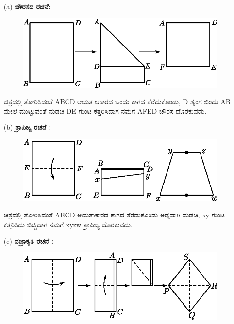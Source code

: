 \begin{itemize}
\item[(a)] \textbf{ಚೌರಸದ ರಚನೆ:}
\begin{figure}[H]
\centering
\includegraphics[scale=.98]{src/figure/chap1/fig1-15a.eps}
\end{figure}

ಚಿತ್ರದಲ್ಲಿ ತೋರಿಸಿದಂತೆ ABCD ಆಯತ ಆಕಾರದ ಒಂದು ಕಾಗದ ತೆರೆದುಕೊಂಡು, D ಶೃಂಗ ಬಿಂದು AB ಮೇಲೆ ಮುಟ್ಟುವಂತೆ ಮಡಚಿ DE ಗುಂಟ ಕತ್ತರಿಸಿದಾಗ ನಮಗೆ  AFED ಚೌರಸ ದೊರಕುವದು. 

\item[(b)] \textbf{ತ್ರಾಪಿಜ್ಯ ರಚನೆ :}
\begin{figure}[H]
\centering
\includegraphics[scale=.98]{src/figure/chap1/fig1-15b.eps}
\end{figure}

ಚಿತ್ರದಲ್ಲಿ ತೋರಿಸಿದಂತೆ ABCD ಆಯತಾಕಾರದ ಕಾಗದ ತೆರೆದುಕೊಂಡು ಅಡ್ಡವಾಗಿ ಮಡಚಿ, xy ಗುಂಟ ಕತ್ತರಿಸಿದು ಬಿಚ್ಚಿದಾಗ ನಮಗೆ xyzw ತ್ರಾಪಿಜ್ಯ ದೊರಕುವದು. 

\item[(c)] \textbf{ವಜ್ರಾಕೃತಿ ರಚನೆ :}
\begin{figure}[H]
\centering
\includegraphics[scale=.98]{src/figure/chap1/fig1-15c.eps}
\end{figure}


\end{itemize}

